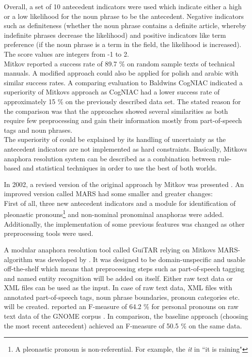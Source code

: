 Overall, a set of 10 antecedent indicators were used which indicate either a high or a low likelihood for the noun phrase to be the antecedent. Negative indicators such as definiteness (whether the noun phrase contains a definite article, whereby indefinite phrases decrease the likelihood) and positive indicators like term preference (if the noun phrase is a term in the field, the likelihood is increased). The score values are integers from -1 to 2. \\
Mitkov reported a success rate of 89.7 \% on random sample texts of technical manuals. A modified approach could also be applied for polish \citep{mitkov2000robust} and arabic \citep{mitkov1998multilingual} with similar success rates.
A comparing evaluation to Baldwins CogNIAC \citep{baldwin1997cogniac} indicated a superiority of Mitkovs approach \citep{mitkov1998robust} as CogNIAC had a lower success rate of approximately 15 \% on the previously described data set. The stated reason for the comparison was that the approaches showed several similarities as both require few preprocessing and gain their information mostly from part-of-speech tags and noun phrases.\\
The superiority of \citep{mitkov1998robust} could be explained by its handling of uncertainty as the antecedent indicators are not implemented as hard constraints. Basically, Mitkovs anaphora resolution system can be described as a combination between rule-based and statistical techniques in order to use the best of both worlds.

In 2002, a revised version of the original approach by Mitkov was presented \citep{mitkov2002new}. An improved version called MARS had some smaller and greater changes:\\
First of all, three new antecedent indicators and a module for identification of pleonastic pronouns\footnote{A pleonastic pronoun is non-referential. For example, the \textit{it} in “it is raining" } and non-nominal pronominal anaphoras were added. Additionally, the implementation of some previous features was changed as other preprocessing tools were used.

A modular anaphora resolution tool called GuiTAR relying on Mitkovs MARS-algorithm \citep{mitkov2002new} was developed by \cite{poesio2004general}. It was designed to be domain-unspecific and usable off-the-shelf which means that preprocessing steps such as part-of-speech tagging and named entity recognition will be added on itself. Either raw text data or XML files can be used as the input. In case of raw text data, XML files with annotated part-of-speech tags, noun phrase boundaries, pronoun categories etc. will be created. \citep{poesio2004mate} reported an F-measure of 64.2 \% for personal pronouns on raw text data of the GNOME corpus \citep{poesio2004general}. In comparison, the baseline approach (choosing the most recent antecedent) achieved an F-measure of 50.5 \% on the same data.

